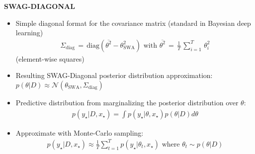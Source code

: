 \begin{whitebox}{\textbf{SWAG-DIAGONAL}}
    \begin{itemize}
        \item Simple diagonal format for the covariance matrix (standard in Bayesian deep learning)
        \begin{align*}
            \Sigma_{\mathrm{diag}}\,=\,\mathrm{diag}(\overline{{{\theta^{2}}}}-\theta_{\mathrm{SWA}}^{2})\text{ with }\overline{{{\theta^{2}}}}\,=\,\frac{1}{T}\,\sum_{i=1}^{T}\,\theta_{i}^{2}
        \end{align*}
        (element-wise squares)
        \item Resulting SWAG-Diagonal posterior distribution approximation: $p(\theta|D)\approx{\mathcal{N}}(\theta_{\mathrm{SWA}},\Sigma_{\mathrm{diag}})$
        \item Predictive distribution from marginalizing the posterior distribution over $\theta$:
        \begin{align*}
            p(y_{\star}|D,x_{\star})=\int p(y_{\star}|\theta,x_{\star})p(\theta|D)d\theta
        \end{align*}
        \item Approximate with Monte-Carlo sampling:
        \begin{align*}
            p(y_{\star}|D,x_{\star})\approx\frac{1}{T}\sum_{t=1}^{T}p(y_{\star}|\theta_{t},x_{\star})\text{ where }\theta_{t}\sim p(\theta|D)
        \end{align*}
    \end{itemize}
\end{whitebox}

